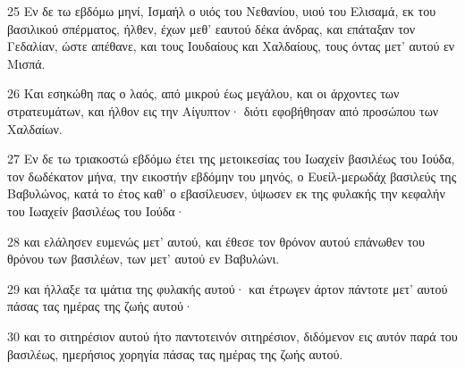 \par 25 Εν δε τω εβδόμω μηνί, Ισμαήλ ο υιός του Νεθανίου, υιού του Ελισαμά, εκ του βασιλικού σπέρματος, ήλθεν, έχων μεθ' εαυτού δέκα άνδρας, και επάταξαν τον Γεδαλίαν, ώστε απέθανε, και τους Ιουδαίους και Χαλδαίους, τους όντας μετ' αυτού εν Μισπά.
\par 26 Και εσηκώθη πας ο λαός, από μικρού έως μεγάλου, και οι άρχοντες των στρατευμάτων, και ήλθον εις την Αίγυπτον· διότι εφοβήθησαν από προσώπου των Χαλδαίων.
\par 27 Εν δε τω τριακοστώ εβδόμω έτει της μετοικεσίας του Ιωαχείν βασιλέως του Ιούδα, τον δωδέκατον μήνα, την εικοστήν εβδόμην του μηνός, ο Ευείλ-μερωδάχ βασιλεύς της Βαβυλώνος, κατά το έτος καθ' ο εβασίλευσεν, ύψωσεν εκ της φυλακής την κεφαλήν του Ιωαχείν βασιλέως του Ιούδα·
\par 28 και ελάλησεν ευμενώς μετ' αυτού, και έθεσε τον θρόνον αυτού επάνωθεν του θρόνου των βασιλέων, των μετ' αυτού εν Βαβυλώνι.
\par 29 και ήλλαξε τα ιμάτια της φυλακής αυτού· και έτρωγεν άρτον πάντοτε μετ' αυτού πάσας τας ημέρας της ζωής αυτού·
\par 30 και το σιτηρέσιον αυτού ήτο παντοτεινόν σιτηρέσιον, διδόμενον εις αυτόν παρά του βασιλέως, ημερήσιος χορηγία πάσας τας ημέρας της ζωής αυτού.


